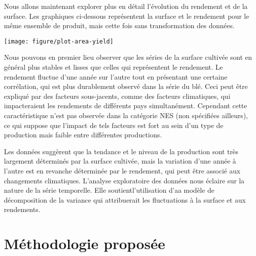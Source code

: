 \documentclass[nojss]{jss}\usepackage{graphicx, color}
\newenvironment{knitrout}{}{} %
\begin{document}
Nous allons maintenant explorer plus en d\'{e}tail l'\'{e}volution du
rendement et de la surface. Les graphiques ci-dessous repr\'{e}sentent
la surface et le rendement pour le m\^{e}me ensemble de produit, mais
cette fois sans transformation des donn\'{e}es.















\begin{knitrout}
\color{fgcolor}

{\centering \texttt{[image: figure/plot-area-yield]} 

}



\end{knitrout}


Nous pouvons en premier lieu observer que les s\'{e}ries de la surface
cultiv\'{e}e sont en g\'{e}n\'{e}ral plus stables et lisses que celles
qui repr\'{e}sentent le rendement. Le rendement fluctue d'une
ann\'{e}e sur l'autre tout en pr\'{e}sentant une certaine
corr\'{e}lation, qui est plus durablement observ\'{e} dans la
s\'{e}rie du bl\'{e}. Ceci peut \^{e}tre expliqu\'{e} par des facteurs
sous-jacents, comme des facteurs climatiques, qui impacteraient les
rendements de diff\'{e}rents pays simultan\'{e}ment. Cependant cette
caract\'{e}ristique n'est pas observ\'{e}e dans la cat\'{e}gorie NES
(non sp\'{e}cifi\'{e}es ailleurs), ce qui suppose que l'impact de tels
facteurs est fort au sein d'un type de production mais faible entre
diff\'{e}rentes productions.


Les donn\'{e}es sugg\`{e}rent que la tendance et le niveau de la
production sont tr\`{e}s largement d\'{e}termin\'{e}s par la surface
cultiv\'{e}e, mais la variation d'une ann\'{e}e \`{a} l'autre est en
revanche d\'{e}termin\'{e}e par le rendement, qui peut \^{e}tre
associ\'{e} aux changements climatiques. L'analyse exploratoire des
donn\'{e}es nous \'{e}claire sur la nature de la s\'{e}rie
temporelle. Elle soutientl'utilisation d'aa mod\`{e}le de d\'{e}composition de la
variance qui attribuerait les fluctuations \`{a} la surface
et aux rendements.





\section{M\'{e}thodologie propos\'{e}e}
\end{document}
